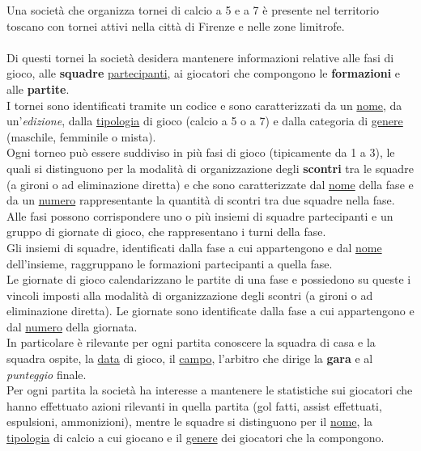 \documentclass[11pt, openany]{article}
\theoremstyle{definition}
\theoremstyle{plain}
\theoremstyle{remark}
\begin{document}
			\begin{tcolorbox}[width=\textwidth,colback={Cornsilk2}]\label{text:analisi richiesta}
				Una società che organizza tornei di calcio a 5 e a 7 è presente nel territorio toscano con tornei attivi nella città di Firenze e nelle zone limitrofe.\\\\
				Di questi tornei la società desidera mantenere informazioni relative alle fasi di gioco, alle \textbf{squadre} \underline{partecipanti}, ai giocatori che compongono le \textbf{formazioni} e alle \textbf{partite}.\\
				I tornei sono identificati tramite un codice e sono caratterizzati da un \underline{nome}, da un’\textit{edizione}, dalla \underline{tipologia} di gioco (calcio a 5 o a 7) e dalla categoria di \underline{genere} (maschile, femminile o mista).\\
				Ogni torneo può essere suddiviso in più fasi di gioco (tipicamente da 1 a 3), le quali si distinguono per la modalità di organizzazione degli \textbf{scontri} tra le squadre (a gironi o ad eliminazione diretta) e che sono caratterizzate dal \underline{nome} della fase e da un \underline{numero} rappresentante la quantità di scontri tra due squadre	nella fase. Alle fasi possono corrispondere uno o più insiemi di squadre partecipanti e un gruppo di
				giornate di gioco, che rappresentano i turni della fase.\\
				Gli insiemi di squadre, identificati dalla fase a cui appartengono e dal \underline{nome} dell'insieme, raggruppano	le formazioni partecipanti a quella fase.\\
				Le giornate di gioco calendarizzano le partite di una fase e possiedono su queste i vincoli imposti alla modalità di organizzazione degli scontri (a gironi o ad eliminazione diretta). Le giornate sono identificate dalla fase a cui appartengono e dal \underline{numero} della giornata.\\
				In particolare è rilevante per ogni partita conoscere la squadra di casa e la squadra ospite, la \underline{data} di gioco, il \underline{campo}, l’arbitro che dirige la \textbf{gara} e al \textit{punteggio} finale.\\
				Per ogni partita la società ha interesse a mantenere le statistiche sui giocatori che hanno effettuato azioni rilevanti in quella partita (gol fatti, assist effettuati, espulsioni, ammonizioni), mentre le squadre si distinguono per il \underline{nome}, la \underline{tipologia} di calcio a cui giocano e il \underline{genere} dei giocatori che la compongono.

\end{tcolorbox}
\end{document}

